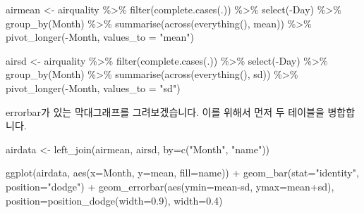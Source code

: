 \documentclass[
]{book}
\newenvironment{Shaded}{\begin{snugshade}}{\end{snugshade}}
\newcommand{\AttributeTok}[1]{\textcolor[rgb]{0.77,0.63,0.00}{#1}}
\newcommand{\FloatTok}[1]{\textcolor[rgb]{0.00,0.00,0.81}{#1}}
\newcommand{\FunctionTok}[1]{\textcolor[rgb]{0.00,0.00,0.00}{#1}}
\newcommand{\NormalTok}[1]{#1}
\newcommand{\OtherTok}[1]{\textcolor[rgb]{0.56,0.35,0.01}{#1}}
\newcommand{\SpecialCharTok}[1]{\textcolor[rgb]{0.00,0.00,0.00}{#1}}
\newcommand{\StringTok}[1]{\textcolor[rgb]{0.31,0.60,0.02}{#1}}
\begin{document}
\begin{Shaded}
\begin{Highlighting}[]
\NormalTok{airmean }\OtherTok{\textless{}{-}}\NormalTok{ airquality }\SpecialCharTok{\%\textgreater{}\%} 
  \FunctionTok{filter}\NormalTok{(}\FunctionTok{complete.cases}\NormalTok{(.)) }\SpecialCharTok{\%\textgreater{}\%} 
  \FunctionTok{select}\NormalTok{(}\SpecialCharTok{{-}}\NormalTok{Day) }\SpecialCharTok{\%\textgreater{}\%} 
  \FunctionTok{group\_by}\NormalTok{(Month) }\SpecialCharTok{\%\textgreater{}\%} 
  \FunctionTok{summarise}\NormalTok{(}\FunctionTok{across}\NormalTok{(}\FunctionTok{everything}\NormalTok{(), mean)) }\SpecialCharTok{\%\textgreater{}\%} 
  \FunctionTok{pivot\_longer}\NormalTok{(}\SpecialCharTok{{-}}\NormalTok{Month, }\AttributeTok{values\_to =} \StringTok{"mean"}\NormalTok{)}

\NormalTok{airsd }\OtherTok{\textless{}{-}}\NormalTok{ airquality }\SpecialCharTok{\%\textgreater{}\%} 
  \FunctionTok{filter}\NormalTok{(}\FunctionTok{complete.cases}\NormalTok{(.)) }\SpecialCharTok{\%\textgreater{}\%} 
  \FunctionTok{select}\NormalTok{(}\SpecialCharTok{{-}}\NormalTok{Day) }\SpecialCharTok{\%\textgreater{}\%} 
  \FunctionTok{group\_by}\NormalTok{(Month) }\SpecialCharTok{\%\textgreater{}\%} 
  \FunctionTok{summarise}\NormalTok{(}\FunctionTok{across}\NormalTok{(}\FunctionTok{everything}\NormalTok{(), sd)) }\SpecialCharTok{\%\textgreater{}\%} 
  \FunctionTok{pivot\_longer}\NormalTok{(}\SpecialCharTok{{-}}\NormalTok{Month, }\AttributeTok{values\_to =} \StringTok{"sd"}\NormalTok{)}
\end{Highlighting}
\end{Shaded}

errorbar가 있는 막대그래프를 그려보겠습니다. 이를 위해서 먼저 두 테이블을 병합합니다.

\begin{Shaded}
\begin{Highlighting}[]
\NormalTok{airdata }\OtherTok{\textless{}{-}} \FunctionTok{left\_join}\NormalTok{(airmean, airsd, }\AttributeTok{by=}\FunctionTok{c}\NormalTok{(}\StringTok{"Month"}\NormalTok{, }\StringTok{"name"}\NormalTok{))}

\FunctionTok{ggplot}\NormalTok{(airdata, }\FunctionTok{aes}\NormalTok{(}\AttributeTok{x=}\NormalTok{Month, }\AttributeTok{y=}\NormalTok{mean, }\AttributeTok{fill=}\NormalTok{name)) }\SpecialCharTok{+}
  \FunctionTok{geom\_bar}\NormalTok{(}\AttributeTok{stat=}\StringTok{"identity"}\NormalTok{, }\AttributeTok{position=}\StringTok{"dodge"}\NormalTok{) }\SpecialCharTok{+}
  \FunctionTok{geom\_errorbar}\NormalTok{(}\FunctionTok{aes}\NormalTok{(}\AttributeTok{ymin=}\NormalTok{mean}\SpecialCharTok{{-}}\NormalTok{sd, }\AttributeTok{ymax=}\NormalTok{mean}\SpecialCharTok{+}\NormalTok{sd), }\AttributeTok{position=}\FunctionTok{position\_dodge}\NormalTok{(}\AttributeTok{width=}\FloatTok{0.9}\NormalTok{), }\AttributeTok{width=}\FloatTok{0.4}\NormalTok{)}
\end{Highlighting}
\end{Shaded}
\end{document}
